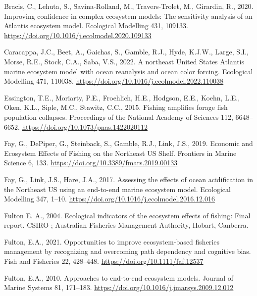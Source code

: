 \documentclass[
]{article}
\newlength{\cslhangindent}
\newenvironment{CSLReferences}[2] %
 {\begin{list}{}{%
  \setlength{\itemindent}{0pt}
  \setlength{\leftmargin}{0pt}
  \setlength{\parsep}{0pt}
  \ifodd #1
   \setlength{\leftmargin}{\cslhangindent}
   \setlength{\itemindent}{-1\cslhangindent}
  \fi
  \setlength{\itemsep}{#2\baselineskip}}}
 {\end{list}}
\begin{document}
\label{refs}
\begin{CSLReferences}{1}{0}
Bracis, C., Lehuta, S., Savina-Rolland, M., Travers-Trolet, M., Girardin, R., 2020. Improving confidence in complex ecosystem models: {The} sensitivity analysis of an {Atlantis} ecosystem model. Ecological Modelling 431, 109133. \url{https://doi.org/10.1016/j.ecolmodel.2020.109133}

Caracappa, J.C., Beet, A., Gaichas, S., Gamble, R.J., Hyde, K.J.W., Large, S.I., Morse, R.E., Stock, C.A., Saba, V.S., 2022. A northeast {United States Atlantis} marine ecosystem model with ocean reanalysis and ocean color forcing. Ecological Modelling 471, 110038. \url{https://doi.org/10.1016/j.ecolmodel.2022.110038}

Essington, T.E., Moriarty, P.E., Froehlich, H.E., Hodgson, E.E., Koehn, L.E., Oken, K.L., Siple, M.C., Stawitz, C.C., 2015. Fishing amplifies forage fish population collapses. Proceedings of the National Academy of Sciences 112, 6648--6652. \url{https://doi.org/10.1073/pnas.1422020112}

Fay, G., DePiper, G., Steinback, S., Gamble, R.J., Link, J.S., 2019. Economic and {Ecosystem Effects} of {Fishing} on the {Northeast US Shelf}. Frontiers in Marine Science 6, 133. \url{https://doi.org/10.3389/fmars.2019.00133}

Fay, G., Link, J.S., Hare, J.A., 2017. Assessing the effects of ocean acidification in the {Northeast US} using an end-to-end marine ecosystem model. Ecological Modelling 347, 1--10. \url{https://doi.org/10.1016/j.ecolmodel.2016.12.016}

Fulton E. A., 2004. Ecological indicators of the ecosystem effects of fishing: Final report. CSIRO ; Australian Fisheries Management Authority, Hobart, Canberra.

Fulton, E.A., 2021. Opportunities to improve ecosystem-based fisheries management by recognizing and overcoming path dependency and cognitive bias. Fish and Fisheries 22, 428--448. \url{https://doi.org/10.1111/faf.12537}

Fulton, E.A., 2010. Approaches to end-to-end ecosystem models. Journal of Marine Systems 81, 171--183. \url{https://doi.org/10.1016/j.jmarsys.2009.12.012}


\end{CSLReferences}
\end{document}
